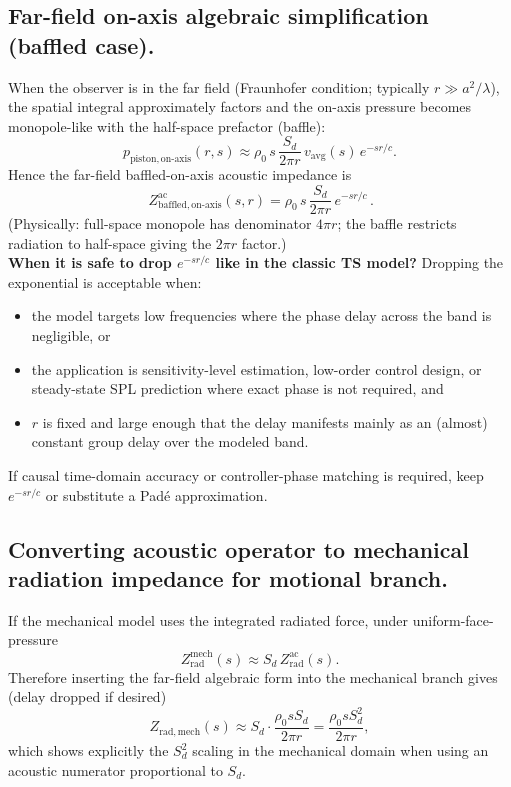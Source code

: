 \subsection{Far-field on-axis algebraic simplification (baffled case).}
When the observer is in the far field (Fraunhofer condition; typically \(r\gg a^2/\lambda\)), the spatial integral approximately factors and the on-axis pressure becomes monopole-like with the half-space prefactor (baffle):
\[
p_{\mathrm{piston,on\text{-}axis}}(r,s)\approx \rho_0\,s\,\frac{S_d}{2\pi r}\,v_{\mathrm{avg}}(s)\,e^{-s r/c}.
\]
Hence the far-field baffled-on-axis acoustic impedance is
\[
\boxed{\,Z_{\mathrm{baffled,on\text{-}axis}}^{\mathrm{ac}}(s,r)
=\rho_0\,s\,\frac{S_d}{2\pi r}\,e^{-s r/c}\,.}
\]
(Physically: full-space monopole has denominator \(4\pi r\); the baffle restricts radiation to half-space giving the \(2\pi r\) factor.)\\

\textbf{When it is safe to drop \(e^{-s r/c}\) like in the classic TS model?}
Dropping the exponential is acceptable when:
\begin{itemize}
  \item the model targets low frequencies where the phase delay across the band is negligible, or
  \item the application is sensitivity-level estimation, low-order control design, or steady-state SPL prediction where exact phase is not required, and
  \item \(r\) is fixed and large enough that the delay manifests mainly as an (almost) constant group delay over the modeled band.
\end{itemize}
If causal time-domain accuracy or controller-phase matching is required, keep \(e^{-s r/c}\) or substitute a Pad\'e approximation.

\subsection{Converting acoustic operator to mechanical radiation impedance for motional branch.}
If the mechanical model uses the integrated radiated force, under uniform-face-pressure
\[
Z_{\mathrm{rad}}^{\mathrm{mech}}(s)\approx S_d\,Z_{\mathrm{rad}}^{\mathrm{ac}}(s).
\]
Therefore inserting the far-field algebraic form into the mechanical branch gives (delay dropped if desired)
\[
Z_{\mathrm{rad,mech}}(s)\approx S_d\cdot\frac{\rho_0 s S_d}{2\pi r} = \frac{\rho_0 s S_d^2}{2\pi r},
\]
which shows explicitly the \(S_d^2\) scaling in the mechanical domain when using an acoustic numerator proportional to \(S_d\).

